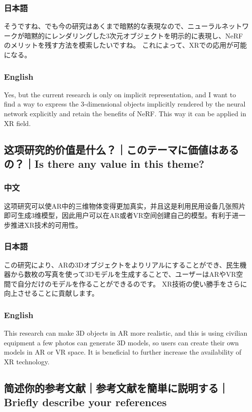 \documentclass[lang=cn,11pt,a4paper]{elegantpaper}
\begin{document}
\subsubsection{日本語}
そうですね、でも今の研究はあくまで暗黙的な表現なので、ニューラルネットワークが暗黙的にレンダリングした3次元オブジェクトを明示的に表現し、NeRFのメリットを残す方法を模索したいですね。 これによって、XRでの応用が可能になる。
\subsubsection{English}
Yes, but the current research is only on implicit representation, and I want to find a way to express the 3-dimensional objects implicitly rendered by the neural network explicitly and retain the benefits of NeRF. This way it can be applied in XR field.

\subsection{这项研究的价值是什么？｜このテーマに価値はあるの？｜Is there any value in this theme?}
\subsubsection{中文}
这项研究可以使AR中的三维物体变得更加真实，并且这是利用民用设备几张照片即可生成3维模型，因此用户可以在AR或者VR空间创建自己的模型。有利于进一步推进XR技术的可用性。
\subsubsection{日本語}
この研究により、ARの3Dオブジェクトをよりリアルにすることができ、民生機器から数枚の写真を使って3Dモデルを生成することで、ユーザーはARやVR空間で自分だけのモデルを作ることができるのです。 XR技術の使い勝手をさらに向上させることに貢献します。
\subsubsection{English}
This research can make 3D objects in AR more realistic, and this is using civilian equipment a few photos can generate 3D models, so users can create their own models in AR or VR space. It is beneficial to further increase the availability of XR technology.

\subsection{简述你的参考文献｜参考文献を簡単に説明する｜Briefly describe your references}
\end{document}

